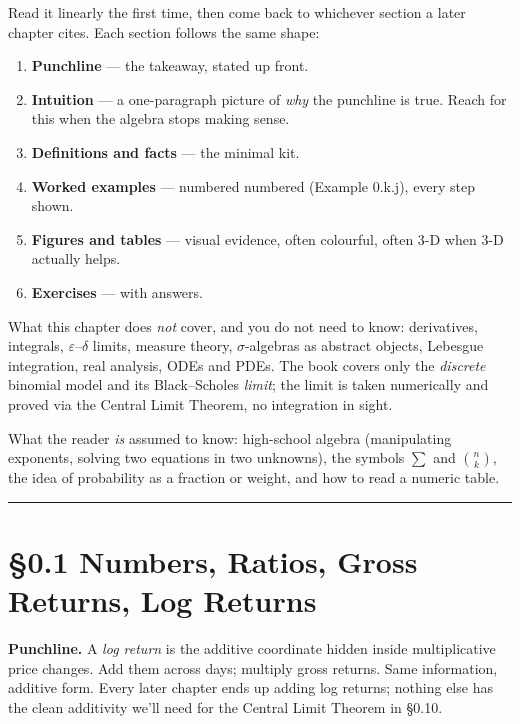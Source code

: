 \documentclass[
  10pt,
  twoside]{book}
\providecommand{\tightlist}{%
  \setlength{\itemsep}{0pt}\setlength{\parskip}{0pt}}
\begin{document}
Read it linearly the first time, then come back to whichever section a
later chapter cites. Each section follows the same shape:

\begin{enumerate}
\def\labelenumi{\arabic{enumi}.}
\tightlist
\item
  \textbf{Punchline} --- the takeaway, stated up front.
\item
  \textbf{Intuition} --- a one-paragraph picture of \emph{why} the
  punchline is true. Reach for this when the algebra stops making sense.
\item
  \textbf{Definitions and facts} --- the minimal kit.
\item
  \textbf{Worked examples} --- numbered numbered (Example 0.k.j), every
  step shown.
\item
  \textbf{Figures and tables} --- visual evidence, often colourful,
  often 3-D when 3-D actually helps.
\item
  \textbf{Exercises} --- with answers.
\end{enumerate}

What this chapter does \emph{not} cover, and you do not need to know:
derivatives, integrals, \(\varepsilon\)--\(\delta\) limits, measure
theory, \(\sigma\)-algebras as abstract objects, Lebesgue integration,
real analysis, ODEs and PDEs. The book covers only the \emph{discrete}
binomial model and its Black--Scholes \emph{limit}; the limit is taken
numerically and proved via the Central Limit Theorem, no integration in
sight.

What the reader \emph{is} assumed to know: high-school algebra
(manipulating exponents, solving two equations in two unknowns), the
symbols \(\sum\) and \(\binom{n}{k}\), the idea of probability as a
fraction or weight, and how to read a numeric table.

\begin{center}\rule{0.5\linewidth}{0.5pt}\end{center}

\section{§0.1 Numbers, Ratios, Gross Returns, Log
Returns}\label{numbers-ratios-gross-returns-log-returns}

\textbf{Punchline.} A \emph{log return} is the additive coordinate
hidden inside multiplicative price changes. Add them across days;
multiply gross returns. Same information, additive form. Every later
chapter ends up adding log returns; nothing else has the clean
additivity we'll need for the Central Limit Theorem in §0.10.
\end{document}
